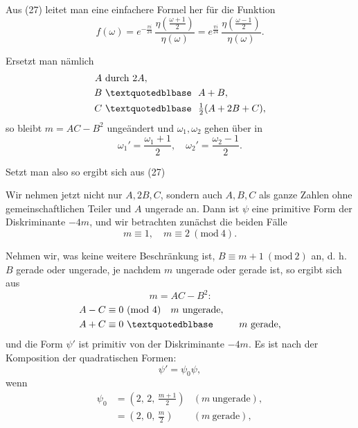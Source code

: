 
Aus (27) leitet man eine einfachere Formel her für die Funktion
\[
f(\omega) = e^{-\frac{\pi i}{24}}\,\frac{\eta\!\left(\frac{\omega+1}{2}\right)}{\eta(\omega)} = e^{\frac{\pi i}{24}}\,\frac{\eta\!\left(\frac{\omega-1}{2}\right)}{\eta(\omega)}.
\]

Ersetzt man nämlich
\[
\begin{aligned}
A &\ \text{durch}\ 2A,\\
B &\ \text{\textquotedblbase}\ \ A+B,\\
C &\ \text{\textquotedblbase}\ \ \tfrac12(A+2B+C),
\end{aligned}
\]
so bleibt $m=AC-B^2$ ungeändert und $\omega_1,\omega_2$ gehen über in
\[
\omega_1' = \frac{\omega_1+1}{2},\quad \omega_2' = \frac{\omega_2-1}{2}.
\]

Setzt man also
so ergibt sich aus (27)

Wir nehmen jetzt nicht nur $A, 2B, C$, sondern auch $A, B, C$ als ganze Zahlen ohne gemeinschaftlichen Teiler und $A$ ungerade an. Dann ist $\psi$ eine primitive Form der Diskriminante $-4m$, und wir betrachten zunächst die beiden Fälle
\[
m\equiv 1,\quad m\equiv 2\ (\mathrm{mod}\ 4).
\]

Nehmen wir, was keine weitere Beschränkung ist, $B\equiv m+1\ (\mathrm{mod}\ 2)$ an, d. h. $B$ gerade oder ungerade, je nachdem $m$ ungerade oder gerade ist, so ergibt sich aus
\[
m = AC-B^2\text{:}
\]
\[
\begin{aligned}
A-C&\equiv 0\ (\mathrm{mod}\ 4) \quad m\ \text{ungerade},\\
A+C&\equiv 0\ \text{\textquotedblbase} \qquad\ \ m\ \text{gerade},
\end{aligned}
\]
und die Form $\psi'$ ist primitiv von der Diskriminante $-4m$. Es ist nach der Komposition der quadratischen Formen:
\[
\psi' = \psi_0\psi,
\]
wenn
\[
\begin{aligned}
\psi_0 &= \left(2,\,2,\,\tfrac{m+1}{2}\right) & (m\ \text{ungerade}),\\
&= \left(2,\,0,\,\tfrac{m}{2}\right) & (m\ \text{gerade}),
\end{aligned}
\]
